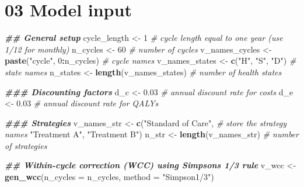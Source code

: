 \documentclass[
]{article}
\newenvironment{Shaded}{\begin{snugshade}}{\end{snugshade}}
\newcommand{\AttributeTok}[1]{\textcolor[rgb]{0.13,0.29,0.53}{#1}}
\newcommand{\CommentTok}[1]{\textcolor[rgb]{0.56,0.35,0.01}{\textit{#1}}}
\newcommand{\DecValTok}[1]{\textcolor[rgb]{0.00,0.00,0.81}{#1}}
\newcommand{\DocumentationTok}[1]{\textcolor[rgb]{0.56,0.35,0.01}{\textbf{\textit{#1}}}}
\newcommand{\FloatTok}[1]{\textcolor[rgb]{0.00,0.00,0.81}{#1}}
\newcommand{\FunctionTok}[1]{\textcolor[rgb]{0.13,0.29,0.53}{\textbf{#1}}}
\newcommand{\NormalTok}[1]{#1}
\newcommand{\OtherTok}[1]{\textcolor[rgb]{0.56,0.35,0.01}{#1}}
\newcommand{\SpecialCharTok}[1]{\textcolor[rgb]{0.81,0.36,0.00}{\textbf{#1}}}
\newcommand{\StringTok}[1]{\textcolor[rgb]{0.31,0.60,0.02}{#1}}
\begin{document}
\hypertarget{model-input}{%
\section{03 Model input}\label{model-input}}

\begin{Shaded}
\begin{Highlighting}[]
\DocumentationTok{\#\# General setup}
\NormalTok{cycle\_length    }\OtherTok{\textless{}{-}} \DecValTok{1}                             \CommentTok{\# cycle length equal to one year (use 1/12 for monthly)}
\NormalTok{n\_cycles        }\OtherTok{\textless{}{-}} \DecValTok{60}                            \CommentTok{\# number of cycles}
\NormalTok{v\_names\_cycles  }\OtherTok{\textless{}{-}} \FunctionTok{paste}\NormalTok{(}\StringTok{"cycle"}\NormalTok{, }\DecValTok{0}\SpecialCharTok{:}\NormalTok{n\_cycles)    }\CommentTok{\# cycle names}
\NormalTok{v\_names\_states  }\OtherTok{\textless{}{-}} \FunctionTok{c}\NormalTok{(}\StringTok{"H"}\NormalTok{, }\StringTok{"S"}\NormalTok{, }\StringTok{"D"}\NormalTok{)              }\CommentTok{\# state names}
\NormalTok{n\_states        }\OtherTok{\textless{}{-}} \FunctionTok{length}\NormalTok{(v\_names\_states)        }\CommentTok{\# number of health states }

\DocumentationTok{\#\#\# Discounting factors }
\NormalTok{d\_c }\OtherTok{\textless{}{-}} \FloatTok{0.03}        \CommentTok{\# annual discount rate for costs }
\NormalTok{d\_e }\OtherTok{\textless{}{-}} \FloatTok{0.03}        \CommentTok{\# annual discount rate for QALYs}

\DocumentationTok{\#\#\# Strategies }
\NormalTok{v\_names\_str     }\OtherTok{\textless{}{-}} \FunctionTok{c}\NormalTok{(}\StringTok{"Standard of Care"}\NormalTok{,         }\CommentTok{\# store the strategy names}
                     \StringTok{"Treatment A"}\NormalTok{, }
                     \StringTok{"Treatment B"}\NormalTok{)  }
\NormalTok{n\_str           }\OtherTok{\textless{}{-}} \FunctionTok{length}\NormalTok{(v\_names\_str)           }\CommentTok{\# number of strategies}

\DocumentationTok{\#\# Within{-}cycle correction (WCC) using Simpson\textquotesingle{}s 1/3 rule }
\NormalTok{v\_wcc }\OtherTok{\textless{}{-}} \FunctionTok{gen\_wcc}\NormalTok{(}\AttributeTok{n\_cycles =}\NormalTok{ n\_cycles,  }\AttributeTok{method =} \StringTok{"Simpson1/3"}\NormalTok{)}


\end{Highlighting}
\end{Shaded}
\end{document}
